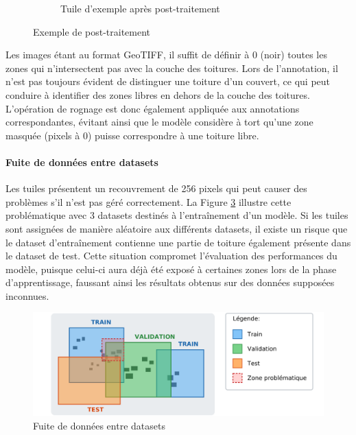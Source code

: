 \begin{figure}[H]
\begin{subfigure}[b]{0.49\textwidth}
        \caption{Tuile d'exemple après post-traitement}
        \label{fig:ch3_postprocessing_dataset_02_exemple_postraitement}
    \end{subfigure}
    \caption{Exemple de post-traitement}
    \label{fig:exemple_post_traitement_dataset}
\end{figure}

Les images étant au format GeoTIFF, il suffit de définir à 0 (noir) toutes les zones qui n'intersectent pas avec la couche des toitures. Lors de l'annotation, il n'est pas toujours évident de distinguer une toiture d'un couvert, ce qui peut conduire à identifier des zones libres en dehors de la couche des toitures. L'opération de rognage est donc également appliquée aux annotations correspondantes, évitant ainsi que le modèle considère à tort qu'une zone masquée (pixels à 0) puisse correspondre à une toiture libre.

\paragraph{Fuite de données entre datasets}
Les tuiles présentent un recouvrement de 256 pixels qui peut causer des problèmes s'il n'est pas géré correctement. La Figure \ref{fig:ch3_postprocessing_dataset_04_data_leakage} illustre cette problématique avec 3 datasets destinés à l'entraînement d'un modèle. Si les tuiles sont assignées de manière aléatoire aux différents datasets, il existe un risque que le dataset d'entraînement contienne une partie de toiture également présente dans le dataset de test. Cette situation compromet l'évaluation des performances du modèle, puisque celui-ci aura déjà été exposé à certaines zones lors de la phase d'apprentissage, faussant ainsi les résultats obtenus sur des données supposées inconnues.

\begin{figure}[H]
    \centering
    \includegraphics[width=1\linewidth]{02-main/figures/ch3/ch3_postprocessing_dataset_04_data_leakage.png}
    \caption{Fuite de données entre datasets}
    \label{fig:ch3_postprocessing_dataset_04_data_leakage}
\end{figure}

